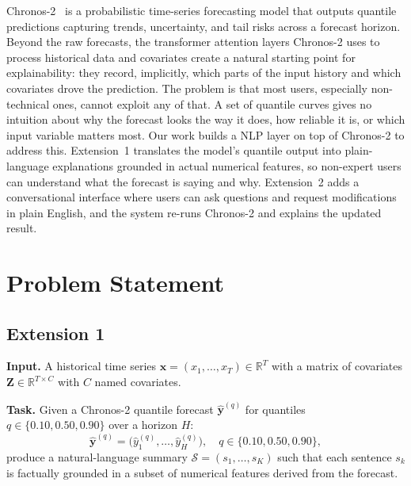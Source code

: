 \documentclass[conference]{IEEEtran}
\begin{document}
Chronos-2~\cite{chronos2} is a probabilistic time-series forecasting model that outputs quantile predictions capturing trends, uncertainty, and tail risks across a forecast horizon. Beyond the raw forecasts, the transformer attention layers Chronos-2 uses to process historical data and covariates create a natural starting point for explainability: they record, implicitly, which parts of the input history and which covariates drove the prediction. The problem is that most users, especially non-technical ones, cannot exploit any of that. A set of quantile curves gives no intuition about why the forecast looks the way it does, how reliable it is, or which input variable matters most. Our work builds a NLP layer on top of Chronos-2 to address this. Extension~1 translates the model's quantile output into plain-language explanations grounded in actual numerical features, so non-expert users can understand what the forecast is saying and why. Extension~2 adds a conversational interface where users can ask questions and request modifications in plain English, and the system re-runs Chronos-2 and explains the updated result.
\section{Problem Statement}

\subsection{Extension 1}

\textbf{Input.}
A historical time series $\mathbf{x} = (x_1, \dots, x_T) \in \mathbb{R}^T$ with a matrix of covariates $\mathbf{Z} \in \mathbb{R}^{T \times C}$ with $C$ named covariates.

\vspace{2mm}

\textbf{Task.}
Given a Chronos-2 quantile forecast $\hat{\mathbf{y}}^{(q)}$ for quantiles $q \in \{0.10, 0.50, 0.90\}$ over a horizon $H$:
%
\begin{equation}
  \hat{\mathbf{y}}^{(q)} = \bigl(\hat{y}^{(q)}_1, \dots, \hat{y}^{(q)}_H\bigr), \quad q \in \{0.10, 0.50, 0.90\},
\end{equation}
%
produce a natural-language summary $\mathcal{S} = (s_1, \dots, s_K)$ such that each sentence $s_k$ is factually grounded in a subset of numerical features derived from the forecast.
\end{document}
